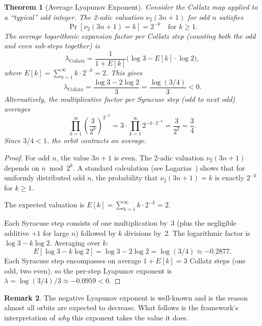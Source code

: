 \documentclass[11pt,a4paper]{article}
\newtheorem{theorem}{Theorem}[section]
\theoremstyle{definition}
\newtheorem{remark}[theorem]{Remark}
\newcommand{\Lyap}{\lambda}
\begin{document}
\begin{theorem}[Average Lyapunov Exponent]\label{thm:lyapunov}
Consider the Collatz map applied to a ``typical'' odd integer. The 2-adic
valuation $\nu_2(3n + 1)$ for odd $n$ satisfies
\[
  \Pr[\nu_2(3n+1) = k] = 2^{-k} \quad \text{for } k \geq 1.
\]
The average logarithmic expansion factor per Collatz step (counting both the
odd and even sub-steps together) is
\begin{equation}\label{eq:lyapunov}
  \Lyap_{\mathrm{Collatz}} = \frac{1}{1 + E[k]}\bigl(\log 3 - E[k] \cdot
  \log 2\bigr),
\end{equation}
where $E[k] = \sum_{k=1}^{\infty} k \cdot 2^{-k} = 2$. This gives
\begin{equation}\label{eq:lyapunov-value}
  \Lyap_{\mathrm{Collatz}} = \frac{\log 3 - 2\log 2}{3}
  = \frac{\log(3/4)}{3} < 0.
\end{equation}
Alternatively, the multiplicative factor per \emph{Syracuse} step (odd to
next odd) averages
\begin{equation}\label{eq:syracuse-factor}
  \prod_{k=1}^{\infty}\left(\frac{3}{2^k}\right)^{2^{-k}}
  = 3 \cdot \prod_{k=1}^{\infty} 2^{-k \cdot 2^{-k}}
  = \frac{3}{2^2} = \frac{3}{4}.
\end{equation}
Since $3/4 < 1$, the orbit contracts on average.
\end{theorem}

\begin{proof}
For odd $n$, the value $3n + 1$ is even. The 2-adic valuation
$\nu_2(3n + 1)$ depends on $n \bmod 2^k$. A standard calculation (see
Lagarias~\cite{lagarias}) shows that for uniformly distributed odd $n$, the
probability that $\nu_2(3n+1) = k$ is exactly $2^{-k}$ for $k \geq 1$.

The expected valuation is
$E[k] = \sum_{k=1}^{\infty} k \cdot 2^{-k} = 2$.

Each Syracuse step consists of one multiplication by~3 (plus the negligible
additive $+1$ for large $n$) followed by $k$ divisions by~2. The
logarithmic factor is $\log 3 - k \log 2$. Averaging over $k$:
\[
  E[\log 3 - k \log 2] = \log 3 - 2\log 2 = \log(3/4) \approx -0.2877.
\]
Each Syracuse step encompasses on average $1 + E[k] = 3$ Collatz steps
(one odd, two even), so the per-step Lyapunov exponent is
$\Lyap = \log(3/4)/3 \approx -0.0959 < 0$.
\end{proof}

\begin{remark}
The negative Lyapunov exponent is well-known and is the reason almost all
orbits are expected to decrease. What follows is the framework's interpretation
of \emph{why} this exponent takes the value it does.
\end{remark}
\end{document}
